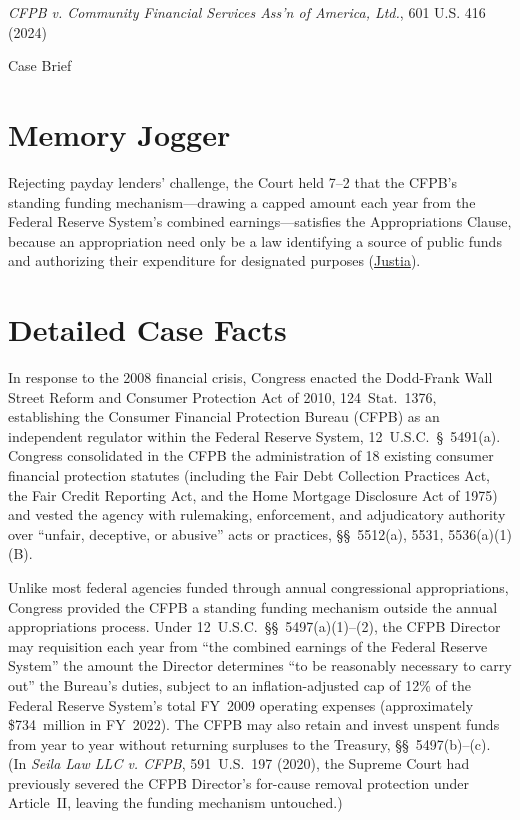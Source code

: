 \documentclass[12pt]{article}
\begin{document}
\begin{center}
{\LARGE \textit{CFPB v. Community Financial Services Ass'n of America, Ltd.}, 601 U.S. 416 (2024)\par}
\vspace{0.8em}
{\large Case Brief\par}
\end{center}
\vspace{1em}

\section{Memory Jogger}
Rejecting payday lenders' challenge, the Court held 7--2 that the CFPB's standing funding mechanism---drawing a capped amount each year from the Federal Reserve System's combined earnings---satisfies the Appropriations Clause, because an appropriation need only be a law identifying a source of public funds and authorizing their expenditure for designated purposes (\href{https://supreme.justia.com/cases/federal/us/601/22-448/}{Justia}).

\section{Detailed Case Facts}
In response to the 2008 financial crisis, Congress enacted the Dodd-Frank Wall Street Reform and Consumer Protection Act of 2010, 124~Stat.~1376, establishing the Consumer Financial Protection Bureau (CFPB) as an independent regulator within the Federal Reserve System, 12~U.S.C.~\S~5491(a). Congress consolidated in the CFPB the administration of 18 existing consumer financial protection statutes (including the Fair Debt Collection Practices Act, the Fair Credit Reporting Act, and the Home Mortgage Disclosure Act of 1975) and vested the agency with rulemaking, enforcement, and adjudicatory authority over ``unfair, deceptive, or abusive'' acts or practices, \S\S~5512(a), 5531, 5536(a)(1)(B).

Unlike most federal agencies funded through annual congressional appropriations, Congress provided the CFPB a standing funding mechanism outside the annual appropriations process. Under 12~U.S.C.~\S\S~5497(a)(1)--(2), the CFPB Director may requisition each year from ``the combined earnings of the Federal Reserve System'' the amount the Director determines ``to be reasonably necessary to carry out'' the Bureau's duties, subject to an inflation-adjusted cap of 12\% of the Federal Reserve System's total FY~2009 operating expenses (approximately \$734~million in FY~2022). The CFPB may also retain and invest unspent funds from year to year without returning surpluses to the Treasury, \S\S~5497(b)--(c). (In \textit{Seila Law LLC v. CFPB}, 591~U.S.~197 (2020), the Supreme Court had previously severed the CFPB Director's for-cause removal protection under Article~II, leaving the funding mechanism untouched.)
\end{document}
